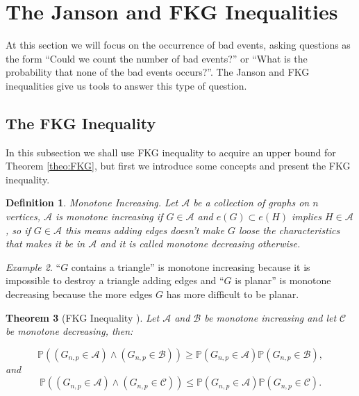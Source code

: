 \documentclass[12pt,twoside,a4paper]{book}
\numberwithin{equation}{section}
\newtheorem{theorem}             {Theorem}[section]
\newtheorem{definition}	[theorem] {Definition}
\theoremstyle{remark}
\newtheorem{example}	[theorem] {Example}
\begin{document}
\section{The Janson and FKG Inequalities}

At this section we will focus on the occurrence of  bad events, asking questions as the form ``Could we count the number of bad events?'' or ``What is the probability that none of the bad events occurs?''. The Janson and FKG inequalities give us tools to answer this type of question.

\subsection{The FKG Inequality}
In this subsection we shall use FKG inequality to acquire an upper bound for Theorem \ref{theo:FKG}, but first we introduce some concepts and present the FKG inequality.

\begin{definition}
Monotone Increasing. Let $\mathcal{A}$ be a collection of graphs on $n$ vertices, $\mathcal{A}$ is monotone increasing if $G \in \mathcal{A}$ and $e(G) \subset e(H)$ implies $H \in \mathcal{A}$, so if $G \in \mathcal{A}$ this means adding edges doesn't make $G$ loose the characteristics that makes it be in $\mathcal{A}$ and it is called monotone decreasing otherwise.     
\end{definition}

\begin{example}
``$G$ contains a triangle'' is monotone increasing because it is impossible to destroy a triangle adding edges and ``$G$ is planar'' is monotone decreasing because the more edges $G$ has more difficult to be planar.
\end{example}

\begin{theorem} [{FKG Inequality \cite{FKG71}}]
 Let $\mathcal{A}$ and $\mathcal{B}$ be monotone increasing and let $\mathcal{C}$ be monotone decreasing, then:

$$ \mathbb{P}((G_{n,p} \in \mathcal{A}) \wedge (G_{n,p} \in \mathcal{B})) \geq \mathbb{P}(G_{n,p} \in \mathcal{A})\mathbb{P}(G_{n,p} \in \mathcal{B}),$$
and
$$ \mathbb{P}((G_{n,p} \in \mathcal{A}) \wedge (G_{n,p} \in \mathcal{C})) \leq \mathbb{P}(G_{n,p} \in \mathcal{A})\mathbb{P}(G_{n,p} \in \mathcal{C}).$$
\end{theorem}
\end{document}
